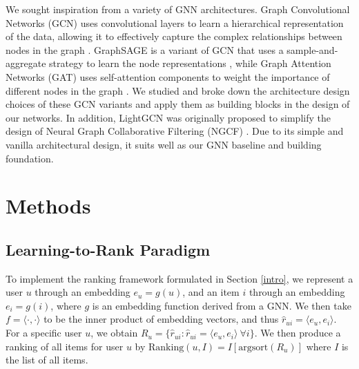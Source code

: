 \documentclass{article}
\begin{document}
We sought inspiration from a variety of GNN architectures. Graph Convolutional Networks (GCN) uses convolutional layers to learn a hierarchical representation of the data, allowing it to effectively capture the complex relationships between nodes in the graph \cite{gcn}. GraphSAGE is a variant of GCN that uses a sample-and-aggregate strategy to learn the node representations \cite{graphsage}, while Graph Attention Networks (GAT) uses self-attention components to weight the importance of different nodes in the graph \cite{gat}. We studied and broke down the architecture design choices of these GCN variants and apply them as building blocks in the design of our networks. In addition, LightGCN \cite{lightgcn} was originally proposed to simplify the design of Neural Graph Collaborative Filtering (NGCF) \cite{ngcf}. Due to its simple and vanilla architectural design, it suits well as our GNN baseline and building foundation. 

\section{Methods}


\subsection{Learning-to-Rank Paradigm}


To implement the ranking framework formulated in Section \ref{intro}, we represent a user $u$ through an embedding $e_u=g(u)$, and an item $i$ through an embedding $e_i=g(i)$, where $g$ is an embedding function derived from a GNN. We then take $f=\langle\cdot{,}\cdot\rangle$ to be the inner product of embedding vectors, and thus $\hat r_{ui} = \langle e_u {,} e_i \rangle$.
For a specific user $u$, we obtain $R_u =\{\hat r_{ui} : \hat r_{ui}=\langle e_u {,} e_i \rangle ~\forall i \}$. We then produce a ranking of all items for user $u$ by $\text{Ranking}(u, I) = I[\text{argsort}(R_u)]$ where $I$ is the list of all items.
\end{document}
